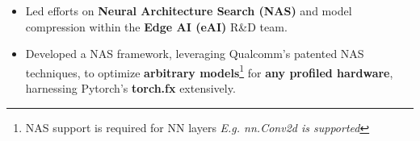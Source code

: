 \documentclass[10pt,a4paper,ragged2e,withhyper]{altacv}
\begin{document}

\begin{paracol}{2}


\makecvheader{}


 

\begin{itemize}
    \item Led efforts on \textbf{Neural Architecture Search (NAS)} and model compression within the \textbf{Edge AI (eAI)} R\&D team.

    \item Developed a NAS framework, leveraging Qualcomm's patented NAS
        techniques, to optimize \textbf{arbitrary models}\footnote*{NAS support is
        required for NN layers \hspace{0.6ex} \textit{E.g. nn.Conv2d is supported}} for \textbf{any profiled hardware}, harnessing
        Pytorch's \textbf{torch.fx} extensively.
    

\end{itemize}
\end{paracol}
\end{document}

